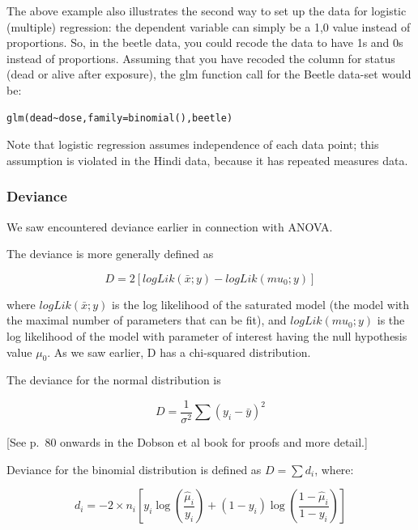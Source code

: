 \documentclass[12pt,]{krantz}
\begin{document}
The above example also illustrates the second way to set up the data for logistic (multiple) regression: the dependent variable can simply be a 1,0 value instead of proportions. So, in the beetle data, you could recode the data to have 1s and 0s instead of proportions. Assuming that you have recoded the column for status (dead or alive after exposure), the glm function call for the Beetle data-set would be:

\begin{verbatim}
glm(dead~dose,family=binomial(),beetle)
\end{verbatim}

Note that logistic regression assumes independence of each data point; this assumption is violated in the Hindi data, because it has repeated measures data.

\hypertarget{deviance}{%
\subsubsection{Deviance}\label{deviance}}

We saw encountered deviance earlier in connection with ANOVA.

The deviance is more generally defined as

\begin{equation}
D = 2[logLik(\bar{x}; y) - logLik(mu_0; y)]
\end{equation}

\noindent
where \(logLik(\bar{x}; y)\) is the log likelihood of the saturated model (the model with the maximal number of parameters that can be fit), and \(logLik(mu_0; y)\) is the log likelihood of the model with parameter of interest having the null hypothesis value \(\mu_0\).
As we saw earlier, D has a chi-squared distribution.

The deviance for the normal distribution is

\begin{equation}
D = \frac{1}{\sigma^2}\sum (y_i - \bar{y})^2
\end{equation}

{[}See p.~80 onwards in the Dobson et al book for proofs and more detail.{]}

Deviance for the binomial distribution is defined as \(D=\sum d_i\), where:

\begin{equation}
d_i = -2 \times n_i [ y_i \log\left(\frac{\hat{\mu}_i}{y_i}\right) + (1-y_i) \log \left(\frac{1-\hat{\mu}_i}{1-y_i}\right) ]  
\end{equation}
\end{document}
